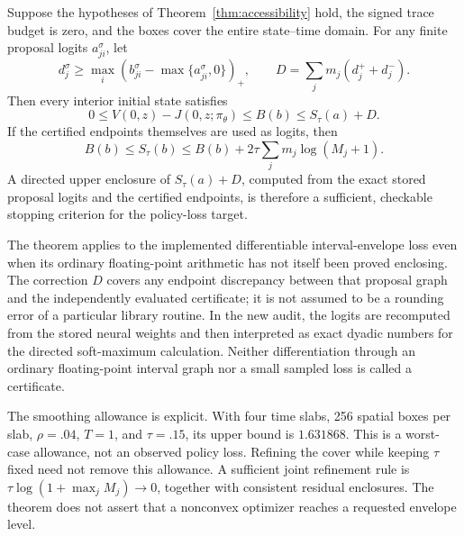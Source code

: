 \begin{theorem}\label{thm:objectivebridge}
Suppose the hypotheses of Theorem~\ref{thm:accessibility} hold, the signed trace budget is zero, and the boxes cover the entire state--time domain. For any finite proposal logits $a^\sigma_{ji}$, let
\[
 d_j^\sigma\geq\max_i\left(b^\sigma_{ji}-\max\{a^\sigma_{ji},0\}\right)_+,
 \qquad D=\sum_jm_j(d_j^++d_j^-).
\]
Then every interior initial state satisfies
\begin{equation}
 0\leq V(0,z)-J(0,z;\pi_\theta)\leq B(b)\leq S_\tau(a)+D.\label{eq:objectivebridge}
\end{equation}
If the certified endpoints themselves are used as logits, then
\begin{equation}
 B(b)\leq S_\tau(b)\leq B(b)+2\tau\sum_jm_j\log(M_j+1).\label{eq:entropygap}
\end{equation}
A directed upper enclosure of $S_\tau(a)+D$, computed from the exact stored proposal logits and the certified endpoints, is therefore a sufficient, checkable stopping criterion for the policy-loss target.
\end{theorem}
The theorem applies to the implemented differentiable interval-envelope loss even when its ordinary floating-point arithmetic has not itself been proved enclosing. The correction $D$ covers any endpoint discrepancy between that proposal graph and the independently evaluated certificate; it is not assumed to be a rounding error of a particular library routine. In the new audit, the logits are recomputed from the stored neural weights and then interpreted as exact dyadic numbers for the directed soft-maximum calculation. Neither differentiation through an ordinary floating-point interval graph nor a small sampled loss is called a certificate.

The smoothing allowance is explicit. With four time slabs, 256 spatial boxes per slab, $\rho=.04$, $T=1$, and $\tau=.15$, its upper bound is $1.631868$. This is a worst-case allowance, not an observed policy loss. Refining the cover while keeping $\tau$ fixed need not remove this allowance. A sufficient joint refinement rule is $\tau\log(1+\max_j M_j)\to0$, together with consistent residual enclosures. The theorem does not assert that a nonconvex optimizer reaches a requested envelope level.

